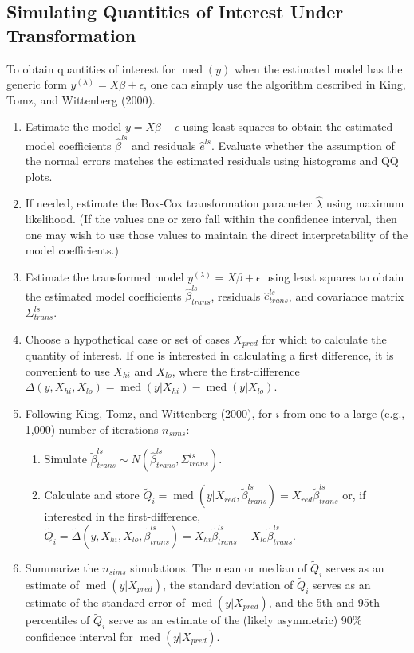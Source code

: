 \documentclass[12pt]{article}
\DeclareMathOperator{\med}{med}
\begin{document}
\subsection*{Simulating Quantities of Interest Under Transformation}

To obtain quantities of interest for $\med(y)$ when the estimated model has the generic form $y^{(\lambda)} = X\beta + \epsilon$, one can simply use the algorithm described in King, Tomz, and Wittenberg (2000).
\begin{enumerate}
\item Estimate the model $y = X\beta + \epsilon$ using least squares to obtain the estimated model coefficients $\hat{\beta}^{ls}$ and residuals $\hat{e}^{ls}$. Evaluate whether the assumption of the normal errors matches the estimated residuals using histograms and QQ plots.
\item If needed, estimate the Box-Cox transformation parameter $\hat{\lambda}$ using maximum likelihood. (If the values one or zero fall within the confidence interval, then one may wish to use those values to maintain the direct interpretability of the model coefficients.)
\item Estimate the transformed model $y^{(\lambda)} = X\beta + \epsilon$ using least squares to obtain the estimated model coefficients $\hat{\beta}^{ls}_{trans}$, residuals $\hat{e}^{ls}_{trans}$, and covariance matrix $\Sigma^{ls}_{trans}$.
\item Choose a hypothetical case or set of cases $X_{pred}$ for which to calculate the quantity of interest. If one is interested in calculating a first difference, it is convenient to use $X_{hi}$ and $X_{lo}$, where the first-difference $\Delta(y, X_{hi}, X_{lo}) = \med(y | X_{hi}) - \med(y | X_{lo})$.
\item Following King, Tomz, and Wittenberg (2000), for $i$ from one to a large (e.g., 1,000) number of iterations $n_{sims}$:
        \begin{enumerate}
        \item Simulate $\tilde{\beta}^{ls}_{trans} \sim N\left(\hat{\beta}^{ls}_{trans}, \Sigma^{ls}_{trans}\right)$.
        \item Calculate and store $\tilde{Q}_i = \med(y | X_{red}, \tilde{\beta}^{ls}_{trans}) = X_{red}\tilde{\beta}^{ls}_{trans}$ or, if interested in the first-difference, $\tilde{Q}_i = \tilde{\Delta}(y, X_{hi}, X_{lo}, \tilde{\beta}^{ls}_{trans}) = X_{hi}\tilde{\beta}^{ls}_{trans} - X_{lo}\tilde{\beta}^{ls}_{trans}$.
        \end{enumerate}
\item Summarize the $n_{sims}$ simulations. The mean or median of $\tilde{Q}_i$ serves as an estimate of $\med(y | X_{pred})$, the standard deviation of $\tilde{Q}_i$ serves as an estimate of the standard error of $\med(y | X_{pred})$, and the 5th and 95th percentiles of $\tilde{Q}_i$ serve as an estimate of the (likely asymmetric) 90\% confidence interval for $\med(y | X_{pred})$.
\end{enumerate}
\end{document}

